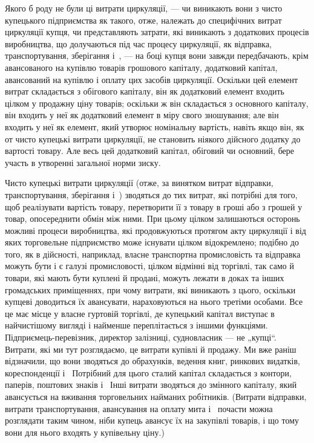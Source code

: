 
Якого б роду не були ці витрати циркуляції, — чи виникають
вони з чисто купецького підприємства як такого, отже, належать
до специфічних витрат циркуляції купця, чи представляють
затрати, які виникають з додаткових процесів виробництва, що
долучаються під час процесу циркуляції, як відправка, транспортування,
зберігання і~, — на боці купця вони завжди передбачають,
крім авансованого на купівлю товарів грошового капіталу,
додатковий капітал, авансований на купівлю і оплату цих
засобів циркуляції. Оскільки цей елемент витрат складається
з обігового капіталу, він як додатковий елемент входить цілком
у продажну ціну товарів; оскільки ж він складається з основного
капіталу, він входить у неї як додатковий елемент в міру
свого зношування; але він входить у неї як елемент, який утворює
номінальну вартість, навіть якщо він, як от чисто купецькі
витрати циркуляції, не становить ніякого дійсного додатку до
вартості товару. Але весь цей додатковий капітал, обіговий
чи основний, бере участь в утворенні загальної норми зиску.

Чисто купецькі витрати циркуляції (отже, за винятком витрат
відправки, транспортування, зберігання і~) зводяться до тих
витрат, які потрібні для того, щоб реалізувати вартість товару,
перетворити її з товару в гроші або з грошей у товар, опосереднити
обмін між ними. При цьому цілком залишаються осторонь
можливі процеси виробництва, які продовжуються протягом
акту циркуляції і від яких торговельне підприємство може
існувати цілком відокремлено; подібно до того, як в дійсності,
наприклад, власне транспортна промисловість та відправка можуть
бути і є галузі промисловості, цілком відмінні від торгівлі,
так само й товари, які мають бути куплені й продані,
можуть лежати в доках та інших громадських приміщеннях, при
чому витрати, які виникають з цього, оскільки купцеві доводиться
їх авансувати, нараховуються на нього третіми особами.
Все це має місце у власне гуртовій торгівлі, де купецький
капітал виступає в найчистішому вигляді і найменше переплітається
з іншими функціями. Підприємець-перевізник, директор
залізниці, судновласник — не „купці“. Витрати, які ми тут розглядаємо,
це витрати купівлі й продажу. Ми вже раніш відзначили,
що вони зводяться до обрахунків, ведення книг, ринкових
видатків, кореспонденції і~ Потрібний для цього сталий
капітал складається з контори, паперів, поштових знаків
і~ Інші витрати зводяться до змінного капіталу, який авансується
на вживання торговельних найманих робітників. (Витрати
відправки, витрати транспортування, авансування на оплату
мита і~ почасти можна розглядати таким чином, ніби купець
авансує їх на закупівлі товарів, і що тому вони для нього входять
у купівельну ціну.)

